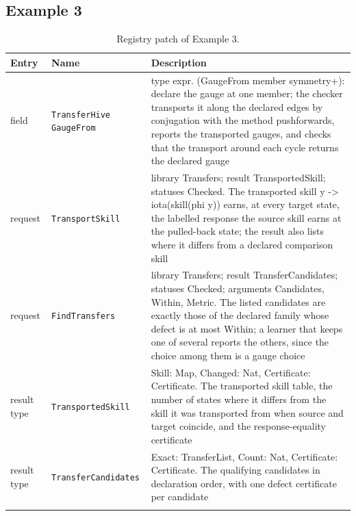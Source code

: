 \documentclass[11pt]{article}
\newcommand{\code}[1]{\texttt{#1}}
\theoremstyle{definition}
\theoremstyle{plain}
\begin{document}
\subsection{Example 3}
\begin{footnotesize}
\begin{longtable}{>{\raggedright\arraybackslash}p{2.2cm}>{\raggedright\arraybackslash}p{4.1cm}>{\raggedright\arraybackslash}p{7.9cm}}
\toprule
Entry & Name & Description\\
\midrule
\endhead
field & \code{TransferHive GaugeFrom} & type expr. (GaugeFrom member symmetry+):\allowbreak{} declare the gauge at one member; the checker transports it along the declared edges by conjugation with the method pushforwards, reports the transported gauges, and checks that the transport around each cycle returns the declared gauge\\
request & \code{TransportSkill} & library Transfers; result TransportedSkill; statuses Checked. The transported skill y -> iota(skill(phi y)) earns, at every target state, the labelled response the source skill earns at the pulled-back state; the result also lists where it differs from a declared comparison skill\\
request & \code{FindTransfers} & library Transfers; result TransferCandidates; statuses Checked; arguments Candidates, Within, Metric. The listed candidates are exactly those of the declared family whose defect is at most Within; a learner that keeps one of several reports the others, since the choice among them is a gauge choice\\
result type & \code{TransportedSkill} & Skill:\allowbreak{} Map, Changed:\allowbreak{} Nat, Certificate:\allowbreak{} Certificate. The transported skill table, the number of states where it differs from the skill it was transported from when source and target coincide, and the response-equality certificate\\
result type & \code{TransferCandidates} & Exact:\allowbreak{} TransferList, Count:\allowbreak{} Nat, Certificate:\allowbreak{} Certificate. The qualifying candidates in declaration order, with one defect certificate per candidate\\
\bottomrule
\caption{Registry patch of Example 3.}
\end{longtable}
\end{footnotesize}
\end{document}
